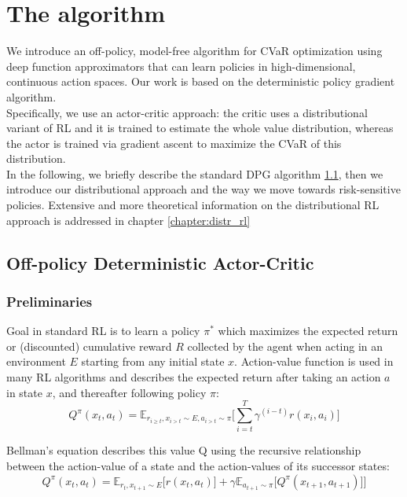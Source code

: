 \chapter{The algorithm }
\label{chapter:algo}

We introduce an off-policy, model-free algorithm for CVaR optimization using deep function approximators
that can learn policies in high-dimensional, continuous action spaces.
Our work is based on the deterministic policy gradient algorithm.\\
Specifically, we use an actor-critic approach: the critic uses a distributional variant
of RL and it is trained to estimate the whole value distribution, whereas the actor
is trained via gradient ascent to maximize the CVaR of this distribution.\\ 
In the following, we briefly describe the standard DPG algorithm \ref{sec:DPG}, then we introduce
our distributional approach and the way we move towards risk-sensitive policies.
Extensive and more theoretical information on the distributional RL approach is addressed in 
chapter \ref{chapter:distr_rl}

\section{Off-policy Deterministic Actor-Critic} \label{sec:DPG} 
\subsection{Preliminaries}

Goal in standard RL is to learn a policy $\pi^*$ which maximizes the expected return or (discounted) cumulative
reward $R$ collected by the agent when acting in an environment $E$ starting from any initial state $x$.
Action-value function is used in many RL algorithms and describes the expected return after taking
an action $a$ in state $x$, and thereafter following policy $\pi$:
\begin{equation}
    Q^\pi(x_t,a_t) = \mathbb E_{r_{i\geq t},x_{i>t} \sim E, a_{i>t}\sim \pi}\Big[  \sum_{i=t}^T \gamma^{(i-t)}r(x_i,a_i) \Big]
\end{equation}

Bellman's equation describes this value Q using the 
recursive relationship between the action-value of a state and the action-values of its
successor states:
\begin{equation}
    Q^\pi(x_t,a_t) = \mathbb E_{r_t,x_{t+1} \sim E}\Big[ r(x_t,a_t)] + \gamma \mathbb E_{a_{t+1}\sim \pi}\big[Q^\pi(x_{t+1},a_{t+1})\big]\Big] \label{eq:bellman1}
\end{equation}


